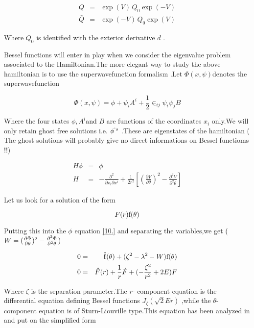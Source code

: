\documentclass[a4paper,11pt]{article}
\begin{document}
\begin{eqnarray*}
Q &=&\exp (V)\,Q_{0}\exp (-V) \\
\bar{Q} &=&\exp (-V)\,Q_{0}\exp (V)
\end{eqnarray*}

Where $Q_{0}$ is identified with the exterior derivative $d$ .

Bessel functions will enter in play when we consider the eigenvalue problem
associated to the Hamiltonian.The more elegant way to study the above
hamiltonian is to use the superwavefunction formalism \cite{Wissale}.Let $%
\Phi (x,\psi )$denotes the superwavefunction

\[
\Phi (x,\psi )=\phi +\psi _{i}A^{i}+\frac{1}{2}\in _{ij}\psi _{i}\psi _{j}B 
\]

Where the four states $\phi ,A^{i}$and $B$ are functions of the coordinates $%
x_{i}$ only.We will only retain ghost free solutions i.e. $\phi ^{`s}$
.These are eigenstates of the hamiltonian ( The ghost solutions will
probably give no direct informations on Bessel functioms !!)

\begin{eqnarray}
H\phi &=&\phi  \label{10.} \\
H &=&-\frac{\partial ^{2}}{\partial x_{i}\partial x^{i}}+\frac{1}{2r^{2}}[(%
\frac{\partial V}{\partial \theta })^{2}-\frac{\partial ^{2}V}{\partial
^{2}\theta }]  \nonumber
\end{eqnarray}

Let us look for a solution of the form

\[
{\large F}(r)\mathrm{f(\theta )} 
\]

Putting this into the $\phi $ equation \ref{10.} and separating the
variables,we get ($W=(\frac{\partial \Phi }{\partial \theta })^{2}-\frac{%
\partial ^{2}\Phi }{\partial ^{2}\theta }$)

\begin{eqnarray*}
0 &=&\mathrm{\ddot{f}}(\theta )+(\zeta ^{2}-\lambda ^{2}-W)\mathrm{f}(\theta
) \\
0 &=&{\large \ddot{F}}(r)+\frac{1}{r}{\large \dot{F}}+(-\frac{\zeta ^{2}}{%
r^{2}}+2E){\large F}
\end{eqnarray*}

Where $\zeta $ is the separation parameter.The $r$- component equation is
the differential equation defining Bessel functions $J_{\zeta }(\sqrt{2}Er)$%
,while the $\theta $-component equation is of Sturn-Liouville type.This
equation has been analyzed in \cite{Wissale} and put on the simplified form
\end{document}
